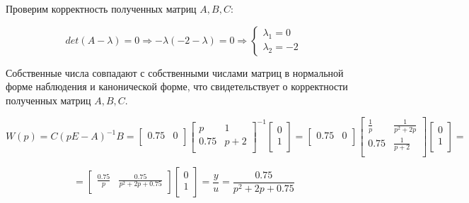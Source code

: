 \documentclass[14pt,a4paper,report]{report}
\begin{document}
Проверим корректность полученных матриц $A, B, C$:

\begin{equation*}
\text{$det(A-\lambda)=0$}
\Longrightarrow
\text{$-\lambda(-2-\lambda)=0$}
\Longrightarrow
\begin{cases}
	\text{$\lambda_1=0$} \\
	\text{$\lambda_2=-2$}
\end{cases}
\end{equation*}

Собственные числа совпадают с собственными числами матриц в нормальной форме наблюдения и канонической форме, что свидетельствует о корректности полученных матриц  $A, B, C$.

\begin{equation*}
\text{$W(p)=C(pE-A)^{-1}B=
\begin{bmatrix}
0.75 & 0 \\
\end{bmatrix}
\begin{bmatrix}
p & 1 \\
0.75 & p+2\\
\end{bmatrix}^{-1}
\begin{bmatrix}
0 \\
1 \\
\end{bmatrix}=
\begin{bmatrix}
0.75 & 0 \\
\end{bmatrix}
\begin{bmatrix}
\frac{1}{p} & \frac{1}{p^2+2p} \\
0.75 & \frac{1}{p+2}\\
\end{bmatrix}
\begin{bmatrix}
0 \\
1 \\
\end{bmatrix}=
$}
\end{equation*}

\begin{equation*}
\text{$=\begin{bmatrix}
	\frac{0.75}{p} & \frac{0.75}{p^2+2p+0.75} \\
	\end{bmatrix}\begin{bmatrix}
	0 \\
	1 \\
	\end{bmatrix}=\frac{y}{u}=\frac{0.75}{p^2+2p+0.75}
	$}
\end{equation*}
\end{document}
